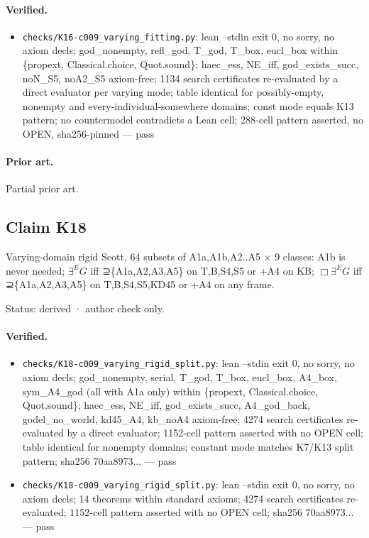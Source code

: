 \documentclass{article}
\begin{document}
\paragraph{Verified.}
\begin{itemize}
\item \texttt{checks/K16-c009\_varying\_fitting.py}: lean --stdin exit 0, no sorry, no axiom decls; god\_nonempty, refl\_god, T\_god, T\_box, eucl\_box within \{propext, Classical.choice, Quot.sound\}; haec\_ess, NE\_iff, god\_exists\_succ, noN\_S5, noA2\_S5 axiom-free; 1134 search certificates re-evaluated by a direct evaluator per varying mode; table identical for possibly-empty, nonempty and every-individual-somewhere domains; const mode equals K13 pattern; no countermodel contradicts a Lean cell; 288-cell pattern asserted, no OPEN, sha256-pinned --- pass
\end{itemize}

\paragraph{Prior art.} Partial prior art.

\subsection*{Claim K18}

Varying-domain rigid Scott, 64 subsets of A1a,A1b,A2..A5 $\times$ 9 classes: A1b is never needed; $\exists^E G$ iff ⊇\{A1a,A2,A3,A5\} on T,B,S4,S5 or +A4 on KB; $\Box\exists^E G$ iff ⊇\{A1a,A2,A3,A5\} on T,B,S4,S5,KD45 or +A4 on any frame.

Status: derived · author check only.

\paragraph{Verified.}
\begin{itemize}
\item \texttt{checks/K18-c009\_varying\_rigid\_split.py}: lean --stdin exit 0, no sorry, no axiom decls; god\_nonempty, serial, T\_god, T\_box, eucl\_box, A4\_box, sym\_A4\_god (all with A1a only) within \{propext, Classical.choice, Quot.sound\}; haec\_ess, NE\_iff, god\_exists\_succ, A4\_god\_back, godel\_no\_world, kd45\_A4, kb\_noA4 axiom-free; 4274 search certificates re-evaluated by a direct evaluator; 1152-cell pattern asserted with no OPEN cell; table identical for nonempty domains; constant mode matches K7/K13 split pattern; sha256 70aa8973... --- pass
\item \texttt{checks/K18-c009\_varying\_rigid\_split.py}: lean --stdin exit 0, no sorry, no axiom decls; 14 theorems within standard axioms; 4274 search certificates re-evaluated; 1152-cell pattern asserted with no OPEN cell; sha256 70aa8973... --- pass
\end{itemize}
\end{document}
